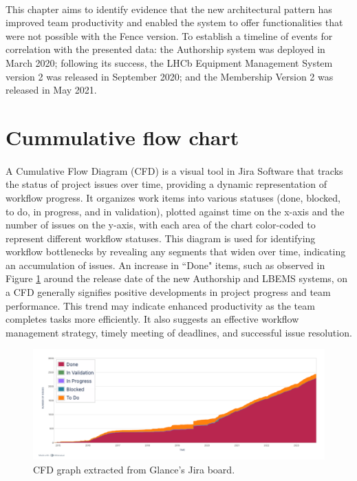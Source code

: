 \paragraph{} This chapter aims to identify evidence that the new architectural pattern has improved team productivity and enabled the system to offer functionalities that were not possible with the Fence version. To establish a timeline of events for correlation with the presented data: the Authorship system was deployed in March 2020; following its success, the LHCb Equipment Management System version 2 was released in September 2020; and the Membership Version 2 was released in May 2021.

\section{Cummulative flow chart}
\paragraph{}A Cumulative Flow Diagram (CFD) is a visual tool in Jira Software that tracks the status of project issues over time, providing a dynamic representation of workflow progress. It organizes work items into various statuses (done, blocked, to do, in progress, and in validation), plotted against time on the x-axis and the number of issues on the y-axis, with each area of the chart color-coded to represent different workflow statuses. This diagram is used for identifying workflow bottlenecks by revealing any segments that widen over time, indicating an accumulation of issues. An increase in ``Done" items, such as observed in Figure \ref{fig:cfc_jira} around the release date of the new Authorship and LBEMS systems, on a CFD generally signifies positive developments in project progress and team performance. This trend may indicate enhanced productivity as the team completes tasks more efficiently. It also suggests an effective workflow management strategy, timely meeting of deadlines, and successful issue resolution.

\begin{figure}[H]
    \centering
    \includegraphics[width=1\linewidth]{figuras/cfd_subtitle.png}
    \caption{CFD graph extracted from Glance's Jira board.}
    \label{fig:cfc_jira}
\end{figure}

